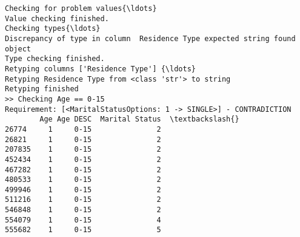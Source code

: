 \documentclass[11pt]{article}
\begin{document}
    \begin{Verbatim}[commandchars=\\\{\}]
Checking for problem values{\ldots}
Value checking finished.
Checking types{\ldots}
Discrepancy of type in column  Residence Type expected string found object
Type checking finished.
Retyping columns ['Residence Type'] {\ldots}
Retyping Residence Type from <class 'str'> to string
Retyping finished
>> Checking Age == 0-15
Requirement: [<MaritalStatusOptions: 1 -> SINGLE>] - CONTRADICTION
        Age Age DESC  Marital Status  \textbackslash{}
26774     1     0-15               2
26821     1     0-15               2
207835    1     0-15               2
452434    1     0-15               2
467282    1     0-15               2
480533    1     0-15               2
499946    1     0-15               2
511216    1     0-15               2
546848    1     0-15               2
554079    1     0-15               4
555682    1     0-15               5


\end{Verbatim}
\end{document}
